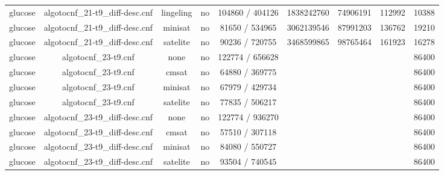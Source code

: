 \begin{appendices}
\begin{table}[p]
\begin{center}
\begin{tabular}{l|cccccccc}
  glucose                        & algotocnf\_21-t9\_diff-desc.cnf & lingeling  & no    & 104860 / 404126 & 1838242760 & 74906191  & 112992     & 10388 \\ %
  glucose                        & algotocnf\_21-t9\_diff-desc.cnf & minisat    & no    & 81650 / 534965 & 3062139546 & 87991203  & 136762     & 19210 \\ %
  glucose                        & algotocnf\_21-t9\_diff-desc.cnf & satelite   & no    & 90236 / 720755 & 3468599865 & 98765464  & 161923     & 16278 \\ %
  glucose                        & algotocnf\_23-t9.cnf           & none       & no    & 122774 / 656628 &           &           &            & 86400 \\ %
  glucose                        & algotocnf\_23-t9.cnf           & cmsat      & no    & 64880 / 369775 &           &           &            & 86400 \\ %
  glucose                        & algotocnf\_23-t9.cnf           & minisat    & no    & 67979 / 429734 &           &           &            & 86400 \\ %
  glucose                        & algotocnf\_23-t9.cnf           & satelite   & no    & 77835 / 506217 &           &           &            & 86400 \\ %
  glucose                        & algotocnf\_23-t9\_diff-desc.cnf & none       & no    & 122774 / 936270 &           &           &            & 86400 \\ %
  glucose                        & algotocnf\_23-t9\_diff-desc.cnf & cmsat      & no    & 57510 / 307118 &           &           &            & 86400 \\ %
  glucose                        & algotocnf\_23-t9\_diff-desc.cnf & minisat    & no    & 84080 / 550727 &           &           &            & 86400 \\ %
  glucose                        & algotocnf\_23-t9\_diff-desc.cnf & satelite   & no    & 93504 / 740545 &           &           &            & 86400 \\ %

\end{tabular}
\end{center}
\end{table}
\end{appendices}
